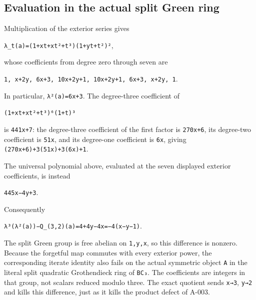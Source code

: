 \documentclass[
  10pt,
]{article}
\begin{document}
\subsection{Evaluation in the actual split Green
ring}\label{evaluation-in-the-actual-split-green-ring}

Multiplication of the exterior series gives

\texttt{\small λ\_\allowbreak{}t(\allowbreak{}a)\allowbreak{}=\allowbreak{}(\allowbreak{}1+\allowbreak{}xt+\allowbreak{}xt²+\allowbreak{}t³)\allowbreak{}(\allowbreak{}1+\allowbreak{}yt+\allowbreak{}t²)\allowbreak{}²},

whose coefficients from degree zero through seven are

\texttt{\small 1,\allowbreak{} x+\allowbreak{}2y,\allowbreak{} 6x+\allowbreak{}3,\allowbreak{} 10x+\allowbreak{}2y+\allowbreak{}1,\allowbreak{} 10x+\allowbreak{}2y+\allowbreak{}1,\allowbreak{} 6x+\allowbreak{}3,\allowbreak{} x+\allowbreak{}2y,\allowbreak{} 1}.

In particular,
\texttt{\small λ²(\allowbreak{}a)\allowbreak{}=\allowbreak{}6x+\allowbreak{}3}.
The degree-three coefficient of

\texttt{\small (\allowbreak{}1+\allowbreak{}xt+\allowbreak{}xt²+\allowbreak{}t³)\allowbreak{}⁶(\allowbreak{}1+\allowbreak{}t)\allowbreak{}³}

is \texttt{\small 441x+\allowbreak{}7}: the degree-three coefficient of
the first factor is \texttt{\small 270x+\allowbreak{}6}, its degree-two
coefficient is \texttt{\small 51x}, and its degree-one coefficient is
\texttt{\small 6x}, giving
\texttt{\small (\allowbreak{}270x+\allowbreak{}6)\allowbreak{}+\allowbreak{}3(\allowbreak{}51x)\allowbreak{}+\allowbreak{}3(\allowbreak{}6x)\allowbreak{}+\allowbreak{}1}.

The universal polynomial above, evaluated at the seven displayed
exterior coefficients, is instead

\texttt{\small 445x−4y+\allowbreak{}3}.

Consequently

\texttt{\small λ³(\allowbreak{}λ²(\allowbreak{}a)\allowbreak{})\allowbreak{}−Q\_\allowbreak{}(\allowbreak{}3,\allowbreak{}2)\allowbreak{}(\allowbreak{}a)\allowbreak{}=\allowbreak{}4+\allowbreak{}4y−4x=\allowbreak{}−4(\allowbreak{}x−y−1)\allowbreak{}}.

The split Green group is free abelian on
\texttt{\small 1,\allowbreak{}y,\allowbreak{}x}, so this difference is
nonzero. Because the forgetful map commutes with every exterior power,
the corresponding iterate identity also fails on the actual symmetric
object \texttt{\small A} in the literal split quadratic Grothendieck
ring of \texttt{\small BC₃}. The coefficients are integers in that
group, not scalars reduced modulo three. The exact quotient sends
\texttt{\small x→\allowbreak{}3}, \texttt{\small y→\allowbreak{}2} and
kills this difference, just as it kills the product defect of A-003.
\end{document}
